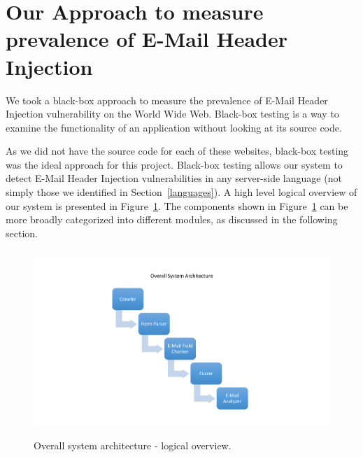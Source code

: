 \section[Approach]{Our Approach to measure prevalence of E-Mail Header Injection}
\label{sys:appr}
We took a black-box approach to measure the prevalence of E-Mail Header Injection vulnerability on the World Wide Web. Black-box testing \cite{wiki:Black-box_testing} is a way to examine the functionality of an application without looking at its source code.

As we did not have the source code for each of these websites, black-box testing was the ideal approach for this project. Black-box testing allows our system to detect E-Mail Header Injection vulnerabilities in any server-side language (not simply those we identified in Section~\ref{languages}). A high level logical overview of our system is presented in Figure~\ref{fig:overall}. The components shown in Figure~\ref{fig:overall} can be more broadly categorized into different modules, as discussed in the following section.

\begin{figure}
	\centering
	\includegraphics[width=14cm, height=7cm]{System/overall_design}
	\caption[]{Overall system architecture - logical overview.}
	\label{fig:overall}
\end{figure}

